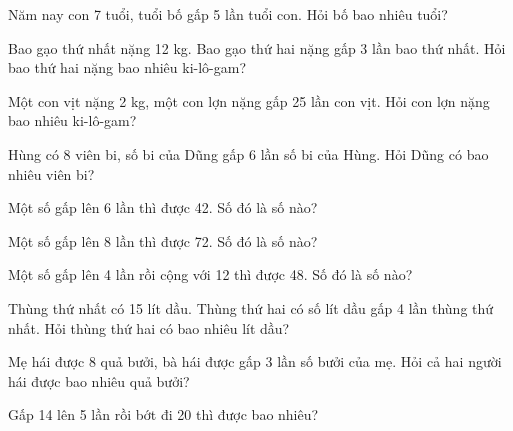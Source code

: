 \begin{ex}
Năm nay con 7 tuổi, tuổi bố gấp 5 lần tuổi con. Hỏi bố bao nhiêu tuổi?
\end{ex}

\begin{ex}
Bao gạo thứ nhất nặng 12 kg. Bao gạo thứ hai nặng gấp 3 lần bao thứ nhất. Hỏi bao thứ hai nặng bao nhiêu ki-lô-gam?
\end{ex}

\begin{ex}
Một con vịt nặng 2 kg, một con lợn nặng gấp 25 lần con vịt. Hỏi con lợn nặng bao nhiêu ki-lô-gam?
\end{ex}

\begin{ex}
Hùng có 8 viên bi, số bi của Dũng gấp 6 lần số bi của Hùng. Hỏi Dũng có bao nhiêu viên bi?
\end{ex}

\begin{ex}
Một số gấp lên 6 lần thì được 42. Số đó là số nào?
\end{ex}

\begin{ex}
Một số gấp lên 8 lần thì được 72. Số đó là số nào?
\end{ex}

\begin{ex}
Một số gấp lên 4 lần rồi cộng với 12 thì được 48. Số đó là số nào?
\end{ex}

\begin{ex}
Thùng thứ nhất có 15 lít dầu. Thùng thứ hai có số lít dầu gấp 4 lần thùng thứ nhất. Hỏi thùng thứ hai có bao nhiêu lít dầu?
\end{ex}

\begin{ex}
Mẹ hái được 8 quả bưởi, bà hái được gấp 3 lần số bưởi của mẹ. Hỏi cả hai người hái được bao nhiêu quả bưởi?
\end{ex}

\begin{ex}
Gấp 14 lên 5 lần rồi bớt đi 20 thì được bao nhiêu?
\end{ex}

